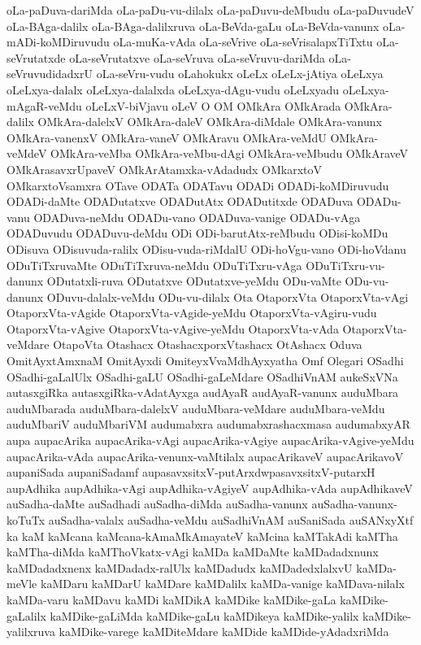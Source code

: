 {oLa-paDuva-dariMda
oLa-paDu-vu-dilalx
oLa-paDuvu-deMbudu
oLa-paDuvudeV
oLa-BAga-dalilx
oLa-BAga-dalilxruva
oLa-BeVda-gaLu
oLa-BeVda-vanunx
oLa-mADi-koMDiruvudu
oLa-muKa-vAda
oLa-seVrive
oLa-seVrisalapxTiTxtu
oLa-seVrutatxde
oLa-seVrutatxve
oLa-seVruva
oLa-seVruvu-dariMda
oLa-seVruvudidadxrU
oLa-seVru-vudu
oLahokukx
oLeLx
oLeLx-jAtiya
oLeLxya
oLeLxya-dalalx
oLeLxya-dalalxda
oLeLxya-dAgu-vudu
oLeLxyadu
oLeLxya-mAgaR-veMdu
oLeLxV-biVjavu
oLeV
O
OM
OMkAra
OMkArada
OMkAra-dalilx
OMkAra-dalelxV
OMkAra-daleV
OMkAra-diMdale
OMkAra-vanunx
OMkAra-vanenxV
OMkAra-vaneV
OMkAravu
OMkAra-veMdU
OMkAra-veMdeV
OMkAra-veMba
OMkAra-veMbu-dAgi
OMkAra-veMbudu
OMkAraveV
OMkArasavxrUpaveV
OMkArAtamxka-vAdadudx
OMkarxtoV
OMkarxtoVsamxra
OTave
ODATa
ODATavu
ODADi
ODADi-koMDiruvudu
ODADi-daMte
ODADutatxve
ODADutAtx
ODADutitxde
ODADuva
ODADu-vanu
ODADuva-neMdu
ODADu-vano
ODADuva-vanige
ODADu-vAga
ODADuvudu
ODADuvu-deMdu
ODi
ODi-barutAtx-reMbudu
ODisi-koMDu
ODisuva
ODisuvuda-ralilx
ODisu-vuda-riMdalU
ODi-hoVgu-vano
ODi-hoVdanu
ODuTiTxruvaMte
ODuTiTxruva-neMdu
ODuTiTxru-vAga
ODuTiTxru-vu-danunx
ODutatxli-ruva
ODutatxve
ODutatxve-yeMdu
ODu-vaMte
ODu-vu-danunx
ODuvu-dalalx-veMdu
ODu-vu-dilalx
Ota
OtaporxVta
OtaporxVta-vAgi
OtaporxVta-vAgide
OtaporxVta-vAgide-yeMdu
OtaporxVta-vAgiru-vudu
OtaporxVta-vAgive
OtaporxVta-vAgive-yeMdu
OtaporxVta-vAda
OtaporxVta-veMdare
OtapoVta
Otashacx
OtashacxporxVtashacx
OtAshacx
Oduva
OmitAyxtAmxnaM
OmitAyxdi
OmiteyxVvaMdhAyxyatha
Omf
Olegari
OSadhi
OSadhi-gaLalUlx
OSadhi-gaLU
OSadhi-gaLeMdare
OSadhiVnAM
aukeSxVNa
autasxgiRka
autasxgiRka-vAdatAyxga
audAyaR
audAyaR-vanunx
auduMbara
auduMbarada
auduMbara-dalelxV
auduMbara-veMdare
auduMbara-veMdu
auduMbariV
auduMbariVM
audumabxra
audumabxrashacxmasa
audumabxyAR
aupa
aupacArika
aupacArika-vAgi
aupacArika-vAgiye
aupacArika-vAgive-yeMdu
aupacArika-vAda
aupacArika-venunx-vaMtilalx
aupacArikaveV
aupacArikavoV
aupaniSada
aupaniSadamf
aupasavxsitxV-putArxdwpasavxsitxV-putarxH
aupAdhika
aupAdhika-vAgi
aupAdhika-vAgiyeV
aupAdhika-vAda
aupAdhikaveV
auSadha-daMte
auSadhadi
auSadha-diMda
auSadha-vanunx
auSadha-vanunx-koTuTx
auSadha-valalx
auSadha-veMdu
auSadhiVnAM
auSaniSada
auSANxyXtf
ka
kaM
kaMcana
kaMcana-kAmaMkAmayateV
kaMcina
kaMTakAdi
kaMTha
kaMTha-diMda
kaMThoVkatx-vAgi
kaMDa
kaMDaMte
kaMDadadxnunx
kaMDadadxnenx
kaMDadadx-ralUlx
kaMDadudx
kaMDadedxlalxvU
kaMDa-meVle
kaMDaru
kaMDarU
kaMDare
kaMDalilx
kaMDa-vanige
kaMDava-nilalx
kaMDa-varu
kaMDavu
kaMDi
kaMDikA
kaMDike
kaMDike-gaLa
kaMDike-gaLalilx
kaMDike-gaLiMda
kaMDike-gaLu
kaMDikeya
kaMDike-yalilx
kaMDike-yalilxruva
kaMDike-varege
kaMDiteMdare
kaMDide
kaMDide-yAdadxriMda
}
